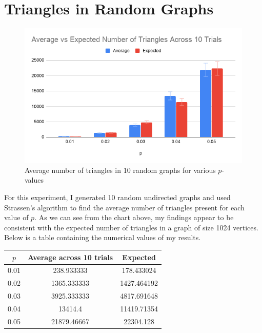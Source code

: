 \documentclass{article}
\begin{document}
\section{Triangles in Random Graphs}
\begin{figure}[htp]
    \centering
    \includegraphics[width=12cm]{avgTriangles.png}
    \caption{Average number of triangles in 10 random graphs for various $p$-values}
    \label{fig:galaxy}
\end{figure}

For this experiment, I generated 10 random undirected graphs and used Strassen's algorithm to find the average number of triangles present for each value of $p$. As we can see from the chart above, my findings appear to be consistent with the expected number of triangles in a graph of size 1024 vertices. Below is a table containing the numerical values of my results.

\begin{center}
    \begin{tabular}{ |c|c|c| } 
    \hline
    $p$ & Average across 10 trials & Expected\\
    \hline
    0.01 & 238.933333  & 178.433024 \\
    0.02 & 1365.333333 & 1427.464192 \\
    0.03 & 3925.333333 & 4817.691648 \\
    0.04 & 13414.4	   & 11419.71354 \\
    0.05 & 21879.46667 & 22304.128\\
    \hline
    
    \end{tabular}
    \end{center}
\end{document}
